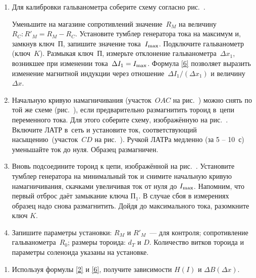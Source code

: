\begin{lab:task}
\begin{enumerate}

	\item Для калибровки гальванометра соберите схему согласно
рис.~.

	Уменьшите на магазине сопротивлений значение~$R_M$ на
	величину~$R_C: R'_M=R_M-R_C$. Установите тумблер генератора тока на максимум
и, замкнув ключ~$\text{П}$, запишите значение
	тока~$I_{\rm max}$. Подключите гальванометр (ключ~$K$). Размыкая
ключ~$\text{П}$, измерьте отклонение гальванометра~$\Delta x_1$,
	возникшее при изменении тока~$\Delta I_1=I_{\rm max}$. Формула \eqref{6}
позволяет выразить изменение магнитной индукции через
	отношение~$\Delta I_1/(\Delta x_1)$ и величину~$\Delta x$.


	\item Начальную кривую намагничивания (участок~$OAC$ на
рис.~) можно снять по той же схеме
(рис.~), если предварительно
	размагнитить тороид в~цепи переменного тока. Для этого соберите схему,
изображённую на рис.~. Включите ЛАТР в~сеть и
	установите ток, соответствующий насыщению~(участок~$CD$ на
рис.~). Ручкой ЛАТРа медленно (за 5 -- 10~с)
уменьшайте ток до
	нуля. Образец размагничен.

	\item Вновь подсоедините тороид к цепи, изображённой на рис.~. Установите тумблер генератора на минимальный ток и
снимите  начальную кривую намагничивания,  скачками увеличивая ток от нуля до
$I_{\rm max}$. Напомним, что первый отброс даёт замыкание ключа $\text{П}_1$.  В
случае сбоя в измерениях образец надо снова размагнитить.
	Дойдя до максимального тока,  разомкните ключ $K$.

	\item Запишите параметры установки: $R_M$ и $R'_M$~--- для контроля;
сопротивление гальванометра~$R_0$; размеры тороида:
	$d_T$ и $D$. Количество витков тороида и параметры соленоида указаны на
установке.

	\end{enumerate}


	\begin{enumerate}

		\item Используя формулы \eqref{2} и \eqref{6}, получите зависимости
        $H(I)$ и $\Delta B(\Delta x)$.


\end{enumerate}
\end{lab:task}
